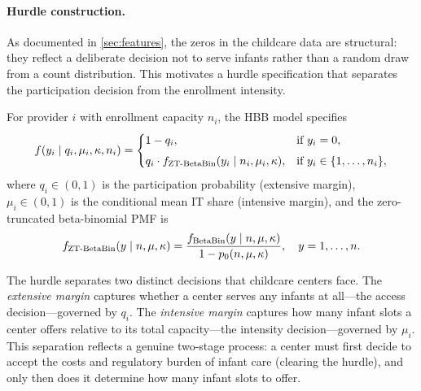 \paragraph{Hurdle construction.}
As documented in \cref{sec:features}, the zeros in the childcare data are
structural: they reflect a deliberate decision not to serve infants rather
than a random draw from a count distribution.  This motivates a hurdle
specification \citep{Mullahy1986,Cragg1971} that separates the participation
decision from the enrollment intensity.

\begin{definition}\label{def:hbb}
  For provider $i$ with enrollment capacity $n_i$, the HBB model specifies
  \begin{equation}\label{eq:hbb}
    f(y_i \mid q_i, \mu_i, \kappa, n_i) =
    \begin{cases}
      1 - q_i, & \text{if } y_i = 0, \\[4pt]
      q_i \cdot f_{\operatorname{ZT\text{-}BetaBin}}(y_i \mid n_i, \mu_i, \kappa),
        & \text{if } y_i \in \{1,\ldots,n_i\},
    \end{cases}
  \end{equation}
  where $q_i \in (0,1)$ is the participation probability (extensive margin),
  $\mu_i \in (0,1)$ is the conditional mean IT share (intensive margin), and
  the zero-truncated beta-binomial PMF is
  \begin{equation}\label{eq:ztbb}
    f_{\operatorname{ZT\text{-}BetaBin}}(y \mid n,\mu,\kappa)
    = \frac{f_{\operatorname{BetaBin}}(y \mid n,\mu,\kappa)}{1 - p_0(n,\mu,\kappa)},
    \quad y = 1,\ldots,n.
  \end{equation}
\end{definition}

The hurdle separates two distinct decisions that childcare centers face. The
\emph{extensive margin} captures whether a center serves any infants at
all---the access decision---governed by $q_i$. The \emph{intensive margin}
captures how many infant slots a center offers relative to its total
capacity---the intensity decision---governed by $\mu_i$. This separation
reflects a genuine two-stage process: a center must first decide to accept the
costs and regulatory burden of infant care (clearing the hurdle), and only then
does it determine how many infant slots to offer.

